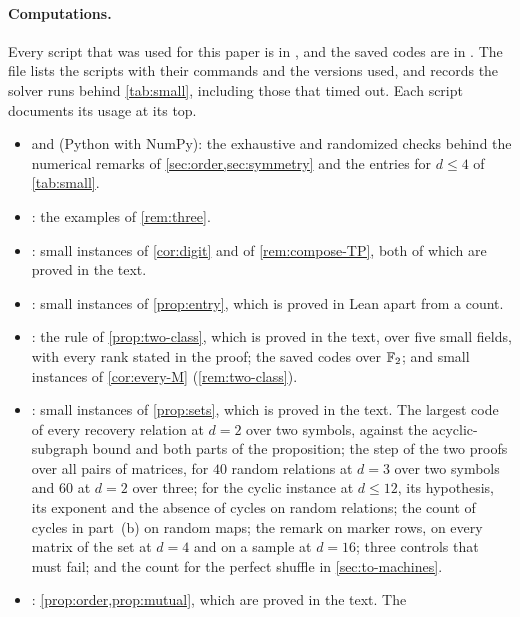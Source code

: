 \paragraph{Computations.} Every script that was used for this paper is in , and the saved codes are
in . The file  lists the scripts with their commands and the versions
used, and records the solver runs behind \cref{tab:small}, including those that timed out. Each script documents its
usage at its top.
\begin{itemize}[leftmargin=1.5em]\raggedright
\item {} and  (Python with
NumPy): the exhaustive and randomized checks behind the numerical remarks of \cref{sec:order,sec:symmetry} and the
entries for $d\le4$ of \cref{tab:small}.
\item {}: the examples of \cref{rem:three}.
\item {}: small instances of \cref{cor:digit} and of
\cref{rem:compose-TP}, both of which are proved in the text.
\item {}: small instances of \cref{prop:entry}, which is proved in Lean apart from
a count.
\item {}: the rule of \cref{prop:two-class}, which is proved in the text, over five
small fields, with every rank stated in the proof; the saved codes over $\mathbb{F}_2$; and small instances of
\cref{cor:every-M} (\cref{rem:two-class}).
\item {}: small instances of \cref{prop:sets}, which is proved in the text. The
largest code of every recovery relation at $d=2$ over two symbols, against the acyclic-subgraph bound and both parts
of the proposition; the step of the two proofs over all pairs of matrices, for $40$ random relations at $d=3$ over
two symbols and $60$ at $d=2$ over three; for the cyclic instance at $d\le12$, its hypothesis, its exponent and the
absence of cycles on random relations; the count of cycles in part~(b) on random maps; the remark on marker rows, on
every matrix of the set at $d=4$ and on a sample at $d=16$; three controls that must fail; and the count for the
perfect shuffle in \cref{sec:to-machines}.
\item {}: \cref{prop:order,prop:mutual}, which are proved in the text. The

\end{itemize}
